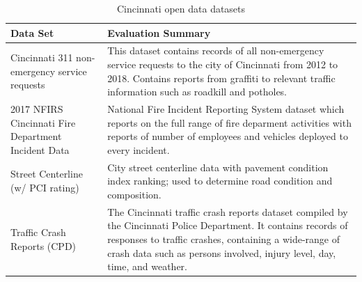 \documentclass{llncs}
\begin{document}
\begin{table}[!ht]
\caption{Cincinnati open data datasets}
\label{table:cincinnatiopendata}
\begin{center}
\begin{tabular}{p{40mm}  p{80mm}}
\hline
\rule{0pt}{12pt}
Data Set & Evaluation Summary\\[2pt]
\hline
Cincinnati 311 non-emergency service requests 
	& This dataset contains records of all non-emergency service requests to the city of Cincinnati from 2012 to 2018. Contains reports from graffiti to relevant traffic information such as 		roadkill and potholes.\\	
2017 NFIRS Cincinnati Fire Department Incident Data 
	& National Fire Incident Reporting System dataset which reports on the full range of fire deparment activities with reports of number of employees and vehicles deployed to every 			incident.\\	
Street Centerline (w/ PCI rating) 
	& City street centerline data with pavement condition index ranking; used to determine road condition and composition.\\	
Traffic Crash Reports (CPD)
	 & The Cincinnati traffic crash reports dataset compiled by the Cincinnati Police Department. It contains records of responses to traffic crashes, containing a wide-range of crash data 		such as persons involved, injury level, day, time, and weather.\\	[2pt]
\hline
\end{tabular}
\end{center}	
\end{table}

%
\end{document}
